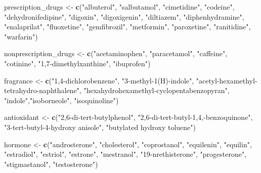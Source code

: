 \documentclass[
]{article}
\newenvironment{Shaded}{\begin{snugshade}}{\end{snugshade}}
\newcommand{\KeywordTok}[1]{\textcolor[rgb]{0.13,0.29,0.53}{\textbf{#1}}}
\newcommand{\NormalTok}[1]{#1}
\newcommand{\StringTok}[1]{\textcolor[rgb]{0.31,0.60,0.02}{#1}}
\begin{document}
\begin{Shaded}
\begin{Highlighting}[]
\NormalTok{prescription_drugs <-}\StringTok{ }\KeywordTok{c}\NormalTok{(}\StringTok{"albuterol"}\NormalTok{, }\StringTok{"salbutamol"}\NormalTok{, }\StringTok{"cimetidine"}\NormalTok{, }\StringTok{"codeine"}\NormalTok{, }
                        \StringTok{"dehydronifedipine"}\NormalTok{, }\StringTok{"digoxin"}\NormalTok{, }\StringTok{"digoxigenin"}\NormalTok{, }\StringTok{"diltiazem"}\NormalTok{, }
                        \StringTok{"diphenhydramine"}\NormalTok{, }\StringTok{"enalaprilat"}\NormalTok{, }\StringTok{"fluoxetine"}\NormalTok{, }\StringTok{"gemfibrozil"}\NormalTok{, }
                        \StringTok{"metformin"}\NormalTok{, }\StringTok{"paroxetine"}\NormalTok{, }\StringTok{"ranitidine"}\NormalTok{, }\StringTok{"warfarin"}\NormalTok{)}

\NormalTok{nonprescription_drugs <-}\StringTok{ }\KeywordTok{c}\NormalTok{(}\StringTok{"acetaminophen"}\NormalTok{, }\StringTok{"paracetamol"}\NormalTok{, }\StringTok{"caffeine"}\NormalTok{, }
                           \StringTok{"cotinine"}\NormalTok{, }\StringTok{"1,7-dimethylxanthine"}\NormalTok{, }\StringTok{"ibuprofen"}\NormalTok{)}

\NormalTok{fragrance <-}\StringTok{ }\KeywordTok{c}\NormalTok{(}\StringTok{"1,4-dichlorobenzene"}\NormalTok{, }\StringTok{"3-methyl-1(H)-indole"}\NormalTok{, }
               \StringTok{"acetyl-hexamethyl-tetrahydro-naphthalene"}\NormalTok{,}
               \StringTok{"hexahydrohexamethyl-cyclopentabenzopyran"}\NormalTok{, }\StringTok{"indole"}\NormalTok{,}\StringTok{"isoborneole"}\NormalTok{,  }
               \StringTok{"isoquinoline"}\NormalTok{)}

\NormalTok{antioxidant <-}\StringTok{ }\KeywordTok{c}\NormalTok{(}\StringTok{"2,6-di-tert-butylphenol"}\NormalTok{, }
                 \StringTok{"2,6-di-tert-butyl-1,4,-benzoquinone"}\NormalTok{, }
                 \StringTok{"3-tert-butyl-4-hydroxy anisole"}\NormalTok{, }\StringTok{"butylated hydroxy toluene"}\NormalTok{)}


\NormalTok{hormone <-}\StringTok{ }\KeywordTok{c}\NormalTok{(}\StringTok{"androsterone"}\NormalTok{, }\StringTok{"cholesterol"}\NormalTok{, }\StringTok{"coprostanol"}\NormalTok{, }\StringTok{"equilenin"}\NormalTok{, }\StringTok{"equilin"}\NormalTok{, }
             \StringTok{"estradiol"}\NormalTok{, }\StringTok{"estriol"}\NormalTok{, }\StringTok{"estrone"}\NormalTok{, }\StringTok{"mestranol"}\NormalTok{, }\StringTok{"19-nrethisterone"}\NormalTok{, }
             \StringTok{"progesterone"}\NormalTok{, }\StringTok{"stigmastanol"}\NormalTok{, }\StringTok{"testosterone"}\NormalTok{)}


\end{Highlighting}
\end{Shaded}
\end{document}
